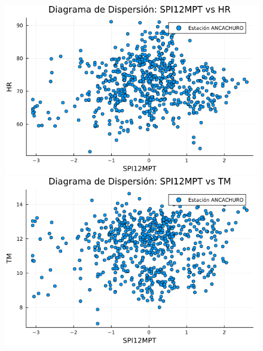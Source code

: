 \begin{figure}[htbp]
\vspace{0.5cm}  %

\begin{minipage}{0.32\textwidth}
    \centering
    \includegraphics[width=\linewidth]{Capitulos/Scaterplot/ANCACHURO_SPI12MPT_vs_HR.png}
\end{minipage}\hfill
\begin{minipage}{0.32\textwidth}
    \centering
    \includegraphics[width=\linewidth]{Capitulos/Scaterplot/ANCACHURO_SPI12MPT_vs_TM.png}
\end{minipage}\hfill
\begin{minipage}{0.32\textwidth}
    \centering

\end{minipage}
\end{figure}
